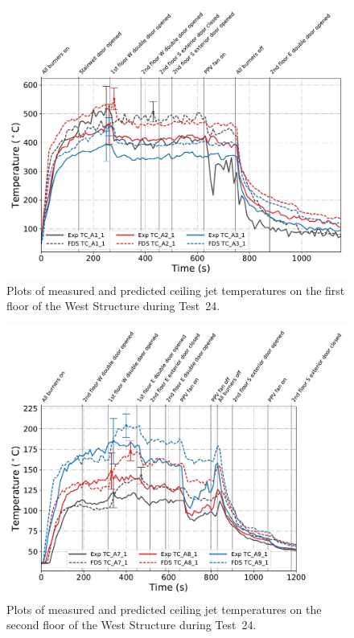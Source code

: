\begin{figure}[!h]
	\centering
	\includegraphics[width=\columnwidth]{Figures/Plots/Validation/Temperature/Test_24_cjet_1}
	\caption[Plots of measured and predicted ceiling jet temperatures on the first floor during Test~24.]{Plots of measured and predicted ceiling jet temperatures on the first floor of the West Structure during Test~24.}
	\label{fig:cjet1_data_Test24}
\end{figure}

\begin{figure}[!h]
	\centering
	\includegraphics[width=\columnwidth]{Figures/Plots/Validation/Temperature/Test_22_cjet_2}
	\caption[Plots of measured and predicted ceiling jet temperatures on the second floor during Test~24.]{Plots of measured and predicted ceiling jet temperatures on the second floor of the West Structure during Test~24.}
	\label{fig:cjet2_data_Test24}
\end{figure}

